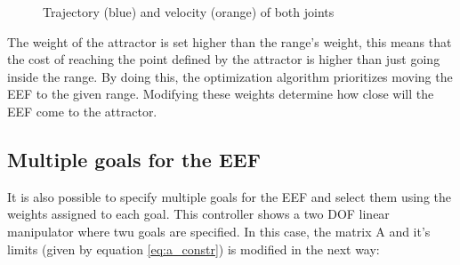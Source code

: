 \begin{figure}[H]
	\centering
	\begin{subfigure}[][Joint $q_{0}$]
		{\texttt{[image: controllers/range\_q0.png]}}
	\end{subfigure}
	\begin{subfigure}[][Joint $q_{1}$]
		{\texttt{[image: controllers/range\_q1.png]}}
	\end{subfigure}
	\vspace{-12pt}
	\caption[Position range with attractor: Joints]{Trajectory (blue) and velocity (orange) of both joints}
	\vspace{-10pt}
	\label{fig:range_q1}
\end{figure}
The weight of the attractor is set higher than the range's weight, this means that the cost of reaching the point defined by the attractor is higher than just going inside the range. By doing this, the optimization algorithm prioritizes moving the EEF to the given range. Modifying these weights determine how close will the EEF come to the attractor.

\subsection{Multiple goals for the EEF}

It is also possible to specify multiple goals for the EEF and select them using the weights assigned to each goal. This controller shows a two DOF  linear manipulator where twu goals are specified. In this case, the matrix A and it's limits (given by equation \ref{eq:a_constr}) is modified in the next way:

